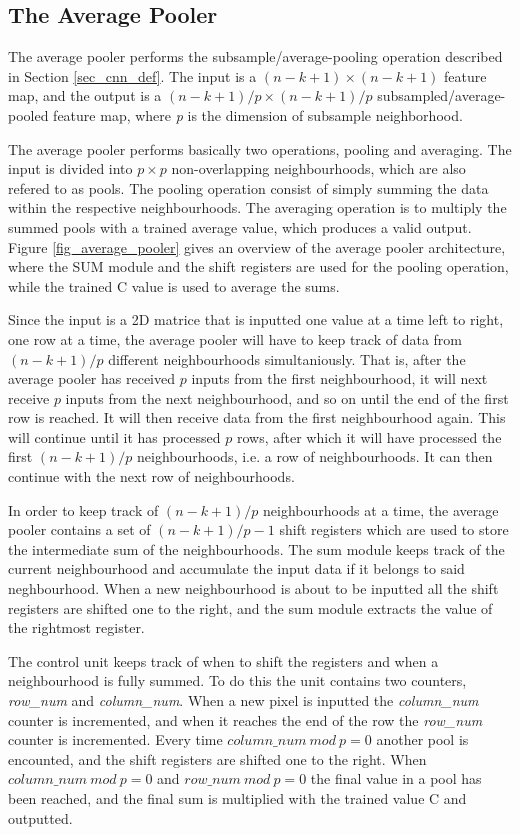 \subsection{The Average Pooler} \label{sec_average_pooler}

The average pooler performs the subsample/average-pooling operation described in Section \ref{sec_cnn_def}. The input is a $ (n-k+1) \times (n-k+1) $ feature map, and the output is a $ (n-k+1)/p \times (n-k+1)/p $ subsampled/average-pooled feature map, where \textit{p} is the dimension of subsample neighborhood. 

The average pooler performs basically two operations, pooling and averaging. The input is divided into $ p \times p $ non-overlapping neighbourhoods, which are also refered to as pools. The pooling operation consist of simply summing the data within the respective neighbourhoods. The averaging operation is to multiply the summed pools with a trained average value, which produces a valid output. Figure \ref{fig_average_pooler} gives an overview of the average pooler architecture, where the SUM module and the shift registers are used for the pooling operation, while the trained C value is used to average the sums. 

Since the input is a 2D matrice that is inputted one value at a time left to right, one row at a time, the average pooler will have to keep track of data from $(n-k+1)/p $ different neighbourhoods simultaniously. That is, after the average pooler has received $ p $ inputs from the first neighbourhood, it will next receive $ p $ inputs from the next neighbourhood, and so on until the end of the first row is reached. It will then receive data from the first neighbourhood again. This will continue until it has processed $ p $ rows, after which it will have processed the first $ (n-k+1)/p $ neighbourhoods, i.e. a row of neighbourhoods. It can then continue with the next row of neighbourhoods.

In order to keep track of $ (n-k+1)/p $ neighbourhoods at a time, the average pooler contains a set of $ (n-k+1)/p - 1 $ shift registers which are used to store the intermediate sum of the neighbourhoods. The sum module keeps track of the current neighbourhood and accumulate the input data if it belongs to said neghbourhood. When a new neighbourhood is about to be inputted all the shift registers are shifted one to the right, and the sum module extracts the value of the rightmost register. 

The control unit keeps track of when to shift the registers and when a neighbourhood is fully summed. To do this the unit contains two counters, \textit{row\_num} and \textit{column\_num}. When a new pixel is inputted the \textit{column\_num} counter is incremented, and when it reaches the end of the row the \textit{row\_num} counter is incremented. Every time $ column\_num~mod~p = 0 $ another pool is encounted, and the shift registers are shifted one to the right. When $ column\_num~mod~p = 0 $ and $ row\_num~mod~p = 0 $ the final value in a pool has been reached, and the final sum is multiplied with the trained value C and outputted. 

